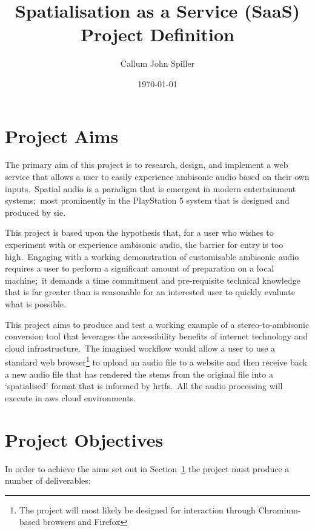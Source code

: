\documentclass[a4paper, 12pt, british]{article}
\begin{document}
\date{\today}
\author{Callum John Spiller}

\title{%
    Spatialisation as a Service (SaaS) \\
    \large Project Definition }

\maketitle
\newpage
\tableofcontents
\newpage

\section{Project Aims}\label{sec:project-aims}
The primary aim of this project is to research, design, and implement a web service that allows a user to easily experience ambisonic audio based on their own inputs.\ Spatial audio is a paradigm that is emergent in modern entertainment systems;\ most prominently in the PlayStation 5 system that is designed and produced by \gls{sie}.

This project is based upon the hypothesis that, for a user who wishes to experiment with or experience ambisonic audio, the barrier for entry is too high.\ Engaging with a working demonstration of customisable ambisonic audio requires a user to perform a significant amount of preparation on a local machine;\ it demands a time commitment and pre-requisite technical knowledge that is far greater than is reasonable for an interested user to quickly evaluate what is possible.

This project aims to produce and test a working example of a stereo-to-ambisonic conversion tool that leverages the accessibility benefits of internet technology and cloud infrastructure.\ The imagined workflow would allow a user to use a standard web browser\footnote{The project will most likely be designed for interaction through Chromium-based browsers and Firefox} to upload an audio file to a website and then receive back a new audio file that has rendered the stems from the original file into a `spatialised' format that is informed by \glspl{hrtf}.\ All the audio processing will execute in \gls{aws} cloud environments.

\section{Project Objectives}\label{sec:project-objectives}

In order to achieve the aims set out in Section~\ref{sec:project-aims} the project must produce a number of deliverables:
\end{document}

